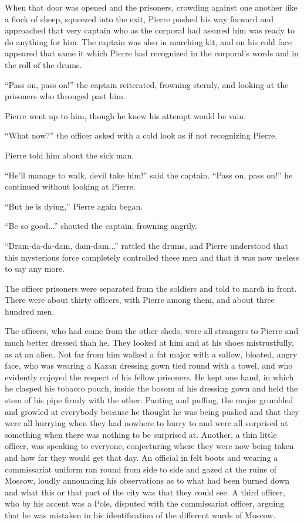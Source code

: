 When that door was opened and the prisoners, crowding against one
another like a flock of sheep, squeezed into the exit, Pierre
pushed his way forward and approached that very captain who as
the corporal had assured him was ready to do anything for
him. The captain was also in marching kit, and on his cold face
appeared that same it which Pierre had recognized in the
corporal's words and in the roll of the drums.

``Pass on, pass on!'' the captain reiterated, frowning sternly,
and looking at the prisoners who thronged past him.

Pierre went up to him, though he knew his attempt would be vain.

``What now?'' the officer asked with a cold look as if not
recognizing Pierre.

Pierre told him about the sick man.

``He'll manage to walk, devil take him!'' said the
captain. ``Pass on, pass on!'' he continued without looking at
Pierre.

``But he is dying,'' Pierre again began.

``Be so good...'' shouted the captain, frowning angrily.

``Dram-da-da-dam, dam-dam...'' rattled the drums, and Pierre
understood that this mysterious force completely controlled these
men and that it was now useless to say any more.

The officer prisoners were separated from the soldiers and told
to march in front. There were about thirty officers, with Pierre
among them, and about three hundred men.

The officers, who had come from the other sheds, were all
strangers to Pierre and much better dressed than he. They looked
at him and at his shoes mistrustfully, as at an alien. Not far
from him walked a fat major with a sallow, bloated, angry face,
who was wearing a Kazan dressing gown tied round with a towel,
and who evidently enjoyed the respect of his fellow prisoners. He
kept one hand, in which he clasped his tobacco pouch, inside the
bosom of his dressing gown and held the stem of his pipe firmly
with the other. Panting and puffing, the major grumbled and
growled at everybody because he thought he was being pushed and
that they were all hurrying when they had nowhere to hurry to and
were all surprised at something when there was nothing to be
surprised at.  Another, a thin little officer, was speaking to
everyone, conjecturing where they were now being taken and how
far they would get that day. An official in felt boots and
wearing a commissariat uniform ran round from side to side and
gazed at the ruins of Moscow, loudly announcing his observations
as to what had been burned down and what this or that part of the
city was that they could see. A third officer, who by his accent
was a Pole, disputed with the commissariat officer, arguing that
he was mistaken in his identification of the different wards of
Moscow.

